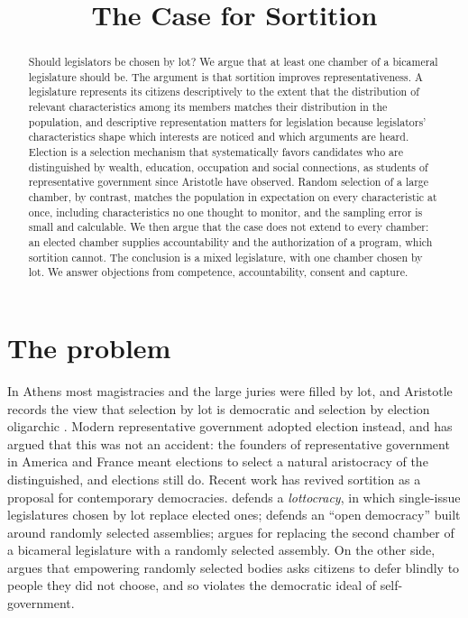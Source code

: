 \documentclass{situationist-preprint}
\title{The Case for Sortition}
\begin{document}
\maketitle

\begin{abstract}
Should legislators be chosen by lot? We argue that at least one chamber of a bicameral legislature should be. The argument is that sortition improves representativeness. A legislature represents its citizens descriptively to the extent that the distribution of relevant characteristics among its members matches their distribution in the population, and descriptive representation matters for legislation because legislators' characteristics shape which interests are noticed and which arguments are heard. Election is a selection mechanism that systematically favors candidates who are distinguished by wealth, education, occupation and social connections, as students of representative government since Aristotle have observed. Random selection of a large chamber, by contrast, matches the population in expectation on every characteristic at once, including characteristics no one thought to monitor, and the sampling error is small and calculable. We then argue that the case does not extend to every chamber: an elected chamber supplies accountability and the authorization of a program, which sortition cannot. The conclusion is a mixed legislature, with one chamber chosen by lot. We answer objections from competence, accountability, consent and capture.
\end{abstract}

\section{The problem}

In Athens most magistracies and the large juries were filled by lot, and Aristotle records the view that selection by lot is democratic and selection by election oligarchic \citep[IV.9, 1294b]{AristotlePol}. Modern representative government adopted election instead, and \citet{Manin1997} has argued that this was not an accident: the founders of representative government in America and France meant elections to select a natural aristocracy of the distinguished, and elections still do. Recent work has revived sortition as a proposal for contemporary democracies. \citet{Guerrero2014} defends a \emph{lottocracy}, in which single-issue legislatures chosen by lot replace elected ones; \citet{Landemore2020} defends an \enquote{open democracy} built around randomly selected assemblies; \citet{Abizadeh2021} argues for replacing the second chamber of a bicameral legislature with a randomly selected assembly. On the other side, \citet{Lafont2019} argues that empowering randomly selected bodies asks citizens to defer blindly to people they did not choose, and so violates the democratic ideal of self-government.
\end{document}
